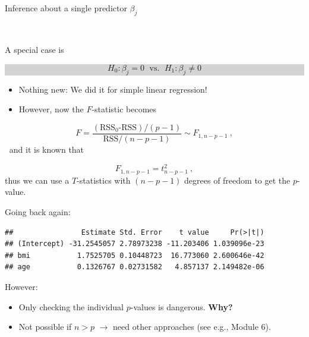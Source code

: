 \documentclass[10pt,ignorenonframetext,]{beamer}
\newenvironment{Shaded}{\begin{snugshade}}{\end{snugshade}}
\newcommand{\KeywordTok}[1]{\textcolor[rgb]{0.13,0.29,0.53}{\textbf{#1}}}
\newcommand{\OperatorTok}[1]{\textcolor[rgb]{0.81,0.36,0.00}{\textbf{#1}}}
\newcommand{\NormalTok}[1]{#1}
\begin{document}
\begin{frame}

\begin{block}{Inference about a single predictor \(\beta_j\)}

\(~\)

A special case is

\begin{center}
\colorbox{lightgray}{\begin{minipage}{7cm}

$$H_0: \beta_j=0 \; \text{ vs. } \; H_1: \beta_j\neq 0$$
\end{minipage}}
\end{center}

\begin{itemize}
\item
  Nothing new: We did it for simple linear regression!
\item
  However, now the \(F\)-statistic becomes
\end{itemize}

\[F=\frac{(\text{RSS$_0$-RSS})/(p-1)}{\text{RSS}/(n-p-1)} \sim F_{1,n-p-1} \ ,\]
\(~\) and it is known that

\[F_{1,n-p-1} = t^2_{n-p-1} \ ,\] thus we can use a \(T\)-statistics
with \((n-p-1)\) degrees of freedom to get the \(p\)-value.

\end{block}

\end{frame}

\begin{frame}[fragile]

Going back again:

\footnotesize

\begin{Shaded}
\end{Shaded}

\begin{verbatim}
##                Estimate Std. Error    t value     Pr(>|t|)
## (Intercept) -31.2545057 2.78973238 -11.203406 1.039096e-23
## bmi           1.7525705 0.10448723  16.773060 2.600646e-42
## age           0.1326767 0.02731582   4.857137 2.149482e-06
\end{verbatim}

\normalsize

However:

\begin{itemize}
\item
  Only checking the individual \(p\)-values is dangerous.
  \textbf{Why?}\\
\item
  Not possible if \(n>p\) \(\rightarrow\) need other approaches (see
  e.g., Module 6).
\end{itemize}

\end{frame}
\end{document}
